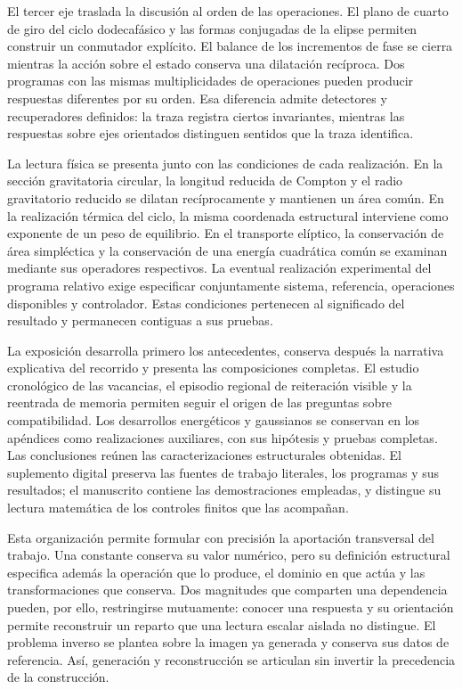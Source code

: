 El tercer eje traslada la discusión al orden de las operaciones. El plano
de cuarto de giro del ciclo dodecafásico y las formas conjugadas de la
elipse permiten construir un conmutador explícito. El balance de los
incrementos de fase se cierra mientras la acción sobre el estado conserva
una dilatación recíproca. Dos programas con las mismas multiplicidades de
operaciones pueden producir respuestas diferentes por su orden. Esa
diferencia admite detectores y recuperadores definidos: la traza registra
ciertos invariantes, mientras las respuestas sobre ejes orientados
distinguen sentidos que la traza identifica.

La lectura física se presenta junto con las condiciones de cada
realización. En la sección gravitatoria circular, la longitud reducida
de Compton y el radio gravitatorio reducido se dilatan recíprocamente y
mantienen un área común. En la realización térmica del ciclo, la misma
coordenada estructural interviene como exponente de un peso de equilibrio.
En el transporte elíptico, la conservación de área simpléctica y la
conservación de una energía cuadrática común se examinan mediante sus
operadores respectivos. La eventual realización experimental del programa
relativo exige especificar conjuntamente sistema, referencia, operaciones
disponibles y controlador. Estas condiciones pertenecen al significado
del resultado y permanecen contiguas a sus pruebas.

La exposición desarrolla primero los antecedentes, conserva después la
narrativa explicativa del recorrido y presenta las composiciones completas.
El estudio cronológico de las vacancias, el episodio regional de reiteración
visible y la reentrada de memoria permiten seguir el origen de las
preguntas sobre compatibilidad. Los desarrollos energéticos y gaussianos
se conservan en los apéndices como realizaciones auxiliares, con sus
hipótesis y pruebas completas.
Las conclusiones reúnen las caracterizaciones estructurales obtenidas.
El suplemento digital preserva las fuentes de trabajo literales, los
programas y sus resultados; el manuscrito contiene las demostraciones
empleadas, y distingue su lectura matemática de los controles finitos que
las acompañan.

Esta organización permite formular con precisión la aportación transversal
del trabajo. Una constante conserva su valor numérico, pero su definición
estructural especifica además la operación que lo produce, el dominio en
que actúa y las transformaciones que conserva. Dos magnitudes que comparten
una dependencia pueden, por ello, restringirse mutuamente: conocer una
respuesta y su orientación permite reconstruir un reparto que una lectura
escalar aislada no distingue. El problema inverso se plantea sobre la imagen
ya generada y conserva sus datos de referencia. Así, generación y
reconstrucción se articulan sin invertir la precedencia de la construcción.

